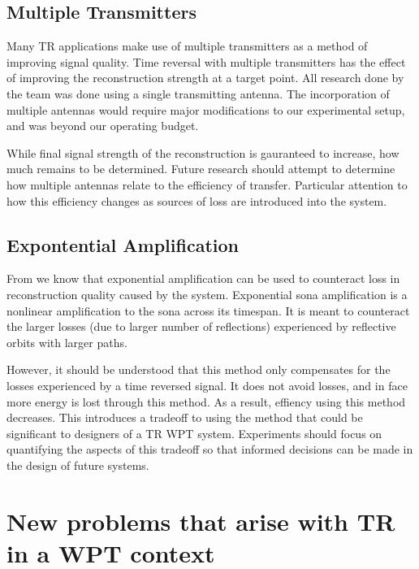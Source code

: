 \subsection{Multiple Transmitters}

Many TR applications make use of multiple transmitters as a method of improving signal quality. Time reversal with multiple transmitters has the effect of improving the reconstruction strength at a target point.  All research done by the team was done using a single transmitting antenna. The incorporation of multiple antennas would require major modifications to our experimental setup, and was beyond our operating budget.

While final signal strength of the reconstruction is gauranteed to increase, how much remains to be determined. Future research should attempt to determine how multiple antennas relate to the efficiency of transfer. Particular attention to how this efficiency changes as sources of loss are introduced into the system.

\subsection{Expontential Amplification}


From \cite{Biniyam} we know that exponential amplification can be used to counteract loss in reconstruction quality caused by the system. Exponential sona amplification is a nonlinear amplification to the sona across its timespan. It is meant to counteract the larger losses (due to larger number of reflections) experienced by reflective orbits with larger paths.

However, it should be understood that this method only compensates for the losses experienced by a time reversed signal. It does not avoid losses, and in face more energy is lost through this method. As a result, effiency using this method decreases. This introduces a tradeoff to using the method that could be significant to designers of a TR WPT system. Experiments should focus on quantifying the aspects of this tradeoff so that informed decisions can be made in the design of future systems.

\section{New problems that arise with TR in a WPT context}
\label{sec:future-wpt}


